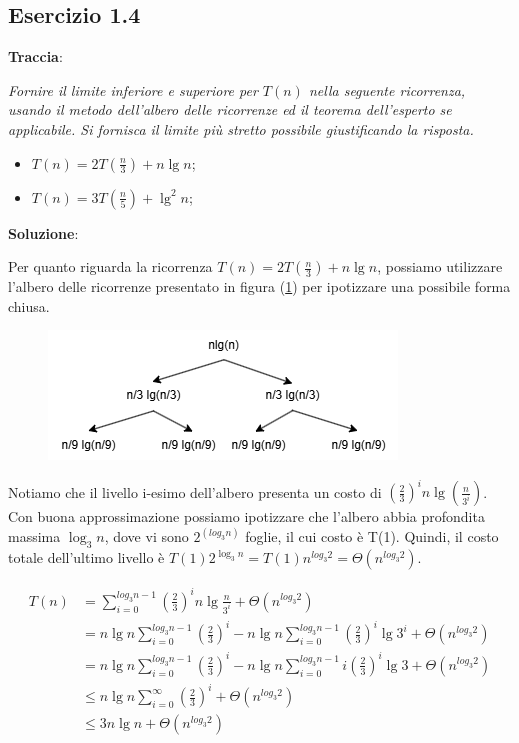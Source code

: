 \documentclass{article}
\begin{document}
\subsection{Esercizio 1.4} \label{subsec:esercizio1_4}
\textbf{Traccia}:

\noindent
\textit{Fornire il limite inferiore e superiore per $T(n)$ nella seguente ricorrenza, usando il metodo dell'albero delle ricorrenze ed il teorema dell'esperto se applicabile. Si fornisca il limite più stretto possibile giustificando la risposta.} 
\begin{itemize}
    \item $T(n) = 2T(\frac{n}{3}) + n\lg n$;
    \item $T(n) = 3T(\frac{n}{5}) + \lg^2 n$;
\end{itemize}

\vspace{\baselineskip}
\noindent
\textbf{Soluzione}: 

\noindent
Per quanto riguarda la ricorrenza $T(n) = 2T(\frac{n}{3}) + n\lg n$, possiamo utilizzare l'albero delle ricorrenze presentato in figura (\ref{fig:recurrence_tree_1}) per ipotizzare una possibile forma chiusa. 

\begin{figure}[ht]
    \centering
    \includegraphics[width=.5\textwidth]{img/recurrence_tree_1.png}
    \label{fig:recurrence_tree_1}
\end{figure}

\noindent
Notiamo che il livello i-esimo dell'albero presenta un costo di $\left(\frac{2}{3}\right)^i n \lg \left(\frac{n}{3^i}\right)$. Con buona approssimazione possiamo ipotizzare che l'albero abbia profondita massima $\log_3 n$, dove vi sono $2^(log_3n)$ foglie, il cui costo è T(1). Quindi, il costo totale dell'ultimo livello è $T(1)2^{\log_{3}{n}} = T(1)n^{log_{3}{2}} = \Theta(n^{log_{3} {2}})$.


\begin{equation} \label{eq:proof_1_4_1_1}
\begin{aligned}
T(n) & = \sum_{i=0}^{log_{3}{n} -1 } \left(\frac{2}{3}\right)^i n \lg{\frac{n}{3^i}} + \Theta(n^{log_{3}{2}}) \\
& = n \lg{n} \sum_{i=0}^{log_{3}{n} -1 }\left(\frac{2}{3}\right)^i - n \lg{n} \sum_{i=0}^{log_{3}{n} -1 }\left(\frac{2}{3}\right)^i \lg{3^i} + \Theta(n^{log_{3}{2}}) \\
& = n \lg{n} \sum_{i=0}^{log_{3}{n} -1 }\left(\frac{2}{3}\right)^i - n \lg{n} \sum_{i=0}^{log_{3}{n} -1 }i\left(\frac{2}{3}\right)^i \lg{3} + \Theta(n^{log_{3}{2}}) \\
& \le n \lg{n} \sum_{i=0}^{\infty}\left(\frac{2}{3}\right)^i + \Theta(n^{log_{3}{2}}) \\
& \le 3 n \lg{n}  + \Theta(n^{log_{3}{2}})
\end{aligned}
\end{equation}
\end{document}
